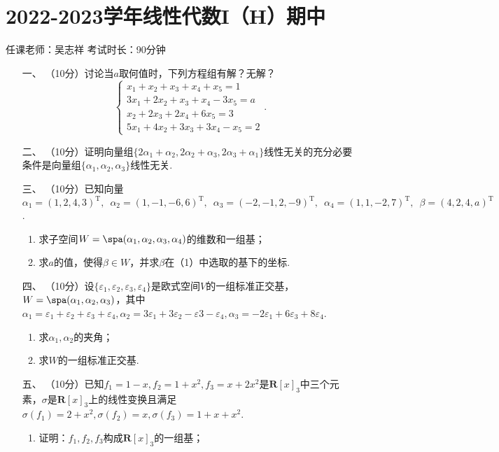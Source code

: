 \section*{2022-2023学年线性代数I（H）期中}

\begin{center}
    任课老师：吴志祥\hspace{4em} 考试时长：90分钟
\end{center}

\begin{enumerate}
	\item[一、]（10分）讨论当$a$取何值时，下列方程组有解？无解？
	\[\begin{cases}
        x_1+x_2+x_3+x_4+x_5=1 \\
        3x_1+2x_2+x_3+x_4-3x_5=a \\
        x_2+2x_3+2x_4+6x_5=3 \\
        5x_1+4x_2+3x_3+3x_4-x_5=2
    \end{cases}.\]
	\item[二、]（10分）证明向量组$\{2\alpha_1+\alpha_2,2\alpha_2+\alpha_3,2\alpha_3+\alpha_1\}$线性无关的充分必要条件是向量组$\{\alpha_1,\alpha_2,\alpha_3\}$线性无关.
	\item[三、]（10分）已知向量$\alpha_1=(1,2,4,3)^\mathrm{T},\enspace \alpha_2=(1,-1,-6,6)^\mathrm{T},\enspace \alpha_3=(-2,-1,2,-9)^\mathrm{T},\enspace \alpha_4=(1,1,-2,7)^\mathrm{T},\enspace \beta=(4,2,4,a)^\mathrm{T}$.
    \begin{enumerate}[label=(\arabic*)]
        \item 求子空间$W=\spa(\alpha_1,\alpha_2,\alpha_3,\alpha_4)$的维数和一组基；

        \item 求$a$的值，使得$\beta\in W$，并求$\beta$在（1）中选取的基下的坐标.
    \end{enumerate}
	\item[四、]（10分）设$\{\varepsilon_1,\varepsilon_2,\varepsilon_3,\varepsilon_4\}$是欧式空间$V$的一组标准正交基，$W=\spa(\alpha_1,\alpha_2,\alpha_3)$，其中$\alpha_1=\varepsilon_1+\varepsilon_2+\varepsilon_3+\varepsilon_4,\alpha_2=3\varepsilon_1+3\varepsilon_2-\varepsilon3-\varepsilon_4,\alpha_3=-2\varepsilon_1+6\varepsilon_3+8\varepsilon_4$.
	\begin{enumerate}[label=(\arabic*)]
        \item 求$\alpha_1,\alpha_2$的夹角；

        \item 求$W$的一组标准正交基.
    \end{enumerate}
	\item[五、]（10分）已知$f_1=1-x,f_2=1+x^2,f_3=x+2x^2$是$\mathbf{R}[x]_3$中三个元素，$\sigma$是$\mathbf{R}[x]_3$上的线性变换且满足$\sigma(f_1)=2+x^2,\sigma(f_2)=x,\sigma(f_3)=1+x+x^2$.
    \begin{enumerate}[label=(\arabic*)]
        \item 证明：$f_1,f_2,f_3$构成$\mathbf{R}[x]_3$的一组基；


\end{enumerate}
\end{enumerate}
